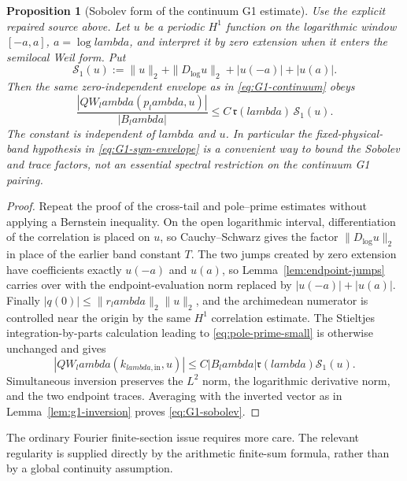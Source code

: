 \documentclass[11pt]{article}
\def\lambda{lambda}%
\newtheorem{proposition}[theorem]{Proposition}
\theoremstyle{remark}
\begin{document}
\begin{proposition}[Sobolev form of the continuum G1 estimate]\label{prop:g1-sobolev}
Use the explicit repaired source above. Let $u$ be a periodic $H^1$ function on the logarithmic window $[-a,a]$,
$a=\log\lambda$, and interpret it by zero extension when it enters the
semilocal Weil form.  Put
\[
 \mathcal S_1(u):=\|u\|_2+\|D_{\log}u\|_2
 +|u(-a)|+|u(a)|.
\]
Then the same zero-independent envelope as in \eqref{eq:G1-continuum} obeys
\begin{equation}\label{eq:G1-sobolev}
 \boxed{
 \frac{|QW_\lambda(p_\lambda,u)|}{|B_\lambda|}
 \le C\,\mathfrak r(\lambda)\,\mathcal S_1(u).}
\end{equation}
The constant is independent of $\lambda$ and $u$.  In particular the
fixed-physical-band hypothesis in \eqref{eq:G1-sym-envelope} is a convenient
way to bound the Sobolev and trace factors, not an essential spectral
restriction on the continuum G1 pairing.
\end{proposition}
\begin{proof}
Repeat the proof of the cross-tail and pole--prime estimates without applying
a Bernstein inequality.  On the open logarithmic interval, differentiation
of the correlation is placed on $u$, so Cauchy--Schwarz gives the factor
$\|D_{\log}u\|_2$ in place of the earlier band constant $T$.  The two jumps
created by zero extension have coefficients exactly $u(-a)$ and $u(a)$, so
Lemma~\ref{lem:endpoint-jumps} carries over with the endpoint-evaluation norm
replaced by $|u(-a)|+|u(a)|$.  Finally
$|q(0)|\le\|r_\lambda\|_2\|u\|_2$, and the archimedean numerator is
controlled near the origin by the same $H^1$ correlation estimate.  The
Stieltjes integration-by-parts calculation leading to
\eqref{eq:pole-prime-small} is otherwise unchanged and gives
\[
 |QW_\lambda(k_{\lambda,\mathrm{in}},u)|
 \le C|B_\lambda|\mathfrak r(\lambda)\mathcal S_1(u).
\]
Simultaneous inversion preserves the $L^2$ norm, the logarithmic derivative
norm, and the two endpoint traces.  Averaging with the inverted vector as in
Lemma~\ref{lem:g1-inversion} proves \eqref{eq:G1-sobolev}.
\end{proof}

The ordinary Fourier finite-section issue requires more care.  The relevant regularity is supplied directly by the arithmetic finite-sum formula, rather than by a global continuity assumption.
\end{document}
